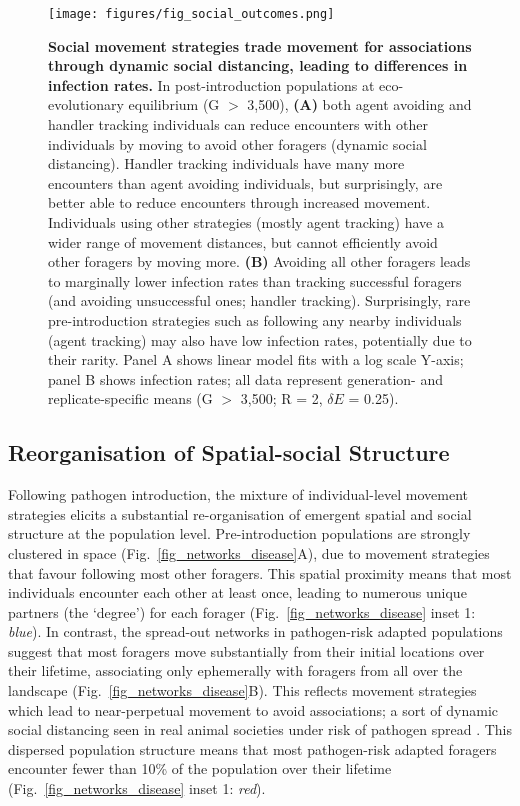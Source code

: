 \begin{figure}[!h]
    \centering
    \texttt{[image: figures/fig\_social\_outcomes.png]}
    \caption{
        \textbf{Social movement strategies trade movement for associations through dynamic social distancing, leading to differences in infection rates.}
        In post-introduction populations at eco-evolutionary equilibrium (G $>$ 3,500), \textbf{(A)} both agent avoiding and handler tracking individuals can reduce encounters with other individuals by moving to avoid other foragers (dynamic social distancing).
        Handler tracking individuals have many more encounters than agent avoiding individuals, but surprisingly, are better able to reduce encounters through increased movement.
        Individuals using other strategies (mostly agent tracking) have a wider range of movement distances, but cannot efficiently avoid other foragers by moving more.
        \textbf{(B)} Avoiding all other foragers leads to marginally lower infection rates than tracking successful foragers (and avoiding unsuccessful ones; handler tracking).
        Surprisingly, rare pre-introduction strategies such as following any nearby individuals (agent tracking) may also have low infection rates, potentially due to their rarity.
        Panel A shows linear model fits with a log scale Y-axis; panel B shows infection rates; all data represent generation- and replicate-specific means (G $>$ 3,500; R = 2, $\delta E$ = 0.25).
    }\label{fig_social_outcomes}
\end{figure}

\subsection*{Reorganisation of Spatial-social Structure}

Following pathogen introduction, the mixture of individual-level movement strategies elicits a substantial re-organisation of emergent spatial and social structure at the population level.
Pre-introduction populations are strongly clustered in space (Fig.~\ref{fig_networks_disease}A), due to movement strategies that favour following most other foragers.
This spatial proximity means that most individuals encounter each other at least once, leading to numerous unique partners (the `degree') for each forager (Fig.~\ref{fig_networks_disease} inset 1: \emph{blue}).
In contrast, the spread-out networks in pathogen-risk adapted populations suggest that most foragers move substantially from their initial locations over their lifetime, associating only ephemerally with foragers from all over the landscape (Fig.~\ref{fig_networks_disease}B).
This reflects movement strategies which lead to near-perpetual movement to avoid associations; a sort of dynamic social distancing seen in real animal societies under risk of pathogen spread \autocite{weinstein2018,stroeymeyt2018,pusceddu2021,stockmaier2021}.
This dispersed population structure means that most pathogen-risk adapted foragers encounter fewer than 10\% of the population over their lifetime (Fig.~\ref{fig_networks_disease} inset 1: \emph{red}).

